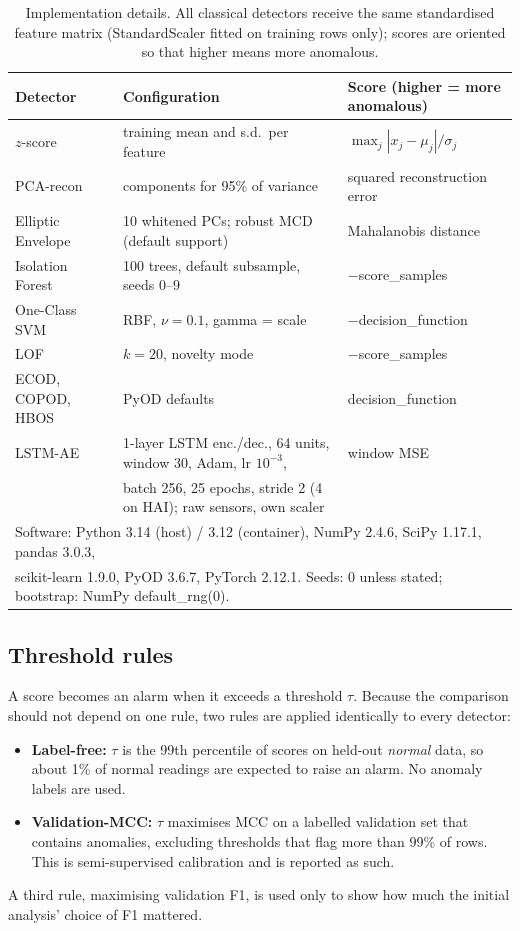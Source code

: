 \documentclass[11pt]{article}
\begin{document}
\begin{table}[t]
\centering\small
\caption{Implementation details. All classical detectors receive the same standardised
feature matrix (StandardScaler fitted on training rows only); scores are oriented so
that higher means more anomalous.}
\label{tab:impl}
\begin{tabular}{lll}
\toprule
Detector & Configuration & Score (higher = more anomalous) \\
\midrule
$z$-score & training mean and s.d.\ per feature & $\max_j |x_j-\mu_j|/\sigma_j$ \\
PCA-recon & components for 95\% of variance & squared reconstruction error \\
Elliptic Envelope & 10 whitened PCs; robust MCD (default support) & Mahalanobis distance \\
Isolation Forest & 100 trees, default subsample, seeds 0--9 & $-$score\_samples \\
One-Class SVM & RBF, $\nu{=}0.1$, gamma = scale & $-$decision\_function \\
LOF & $k{=}20$, novelty mode & $-$score\_samples \\
ECOD, COPOD, HBOS & PyOD defaults & decision\_function \\
LSTM-AE & 1-layer LSTM enc./dec., 64 units, window 30, Adam, lr $10^{-3}$, & window MSE \\
 & batch 256, 25 epochs, stride 2 (4 on HAI); raw sensors, own scaler & \\
\midrule
\multicolumn{3}{l}{Software: Python 3.14 (host) / 3.12 (container), NumPy 2.4.6, SciPy 1.17.1, pandas 3.0.3,}\\
\multicolumn{3}{l}{scikit-learn 1.9.0, PyOD 3.6.7, PyTorch 2.12.1. Seeds: 0 unless stated; bootstrap: NumPy default\_rng(0).}\\
\bottomrule
\end{tabular}
\end{table}

\subsection{Threshold rules}
\label{sec:thr}
A score becomes an alarm when it exceeds a threshold $\tau$. Because the
comparison should not depend on one rule, two rules are applied identically to
every detector:
\begin{itemize}
\item \textbf{Label-free:} $\tau$ is the 99th percentile of scores on held-out
\emph{normal} data, so about 1\% of normal readings are expected to raise an
alarm. No anomaly labels are used.
\item \textbf{Validation-MCC:} $\tau$ maximises MCC on a labelled validation
set that contains anomalies, excluding thresholds that flag more than 99\% of
rows. This is semi-supervised calibration and is reported as such.
\end{itemize}
A third rule, maximising validation F1, is used only to show how much the
initial analysis' choice of F1 mattered.
\end{document}
